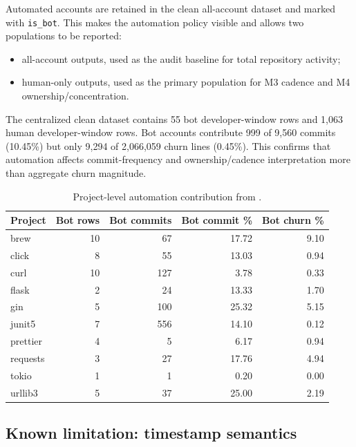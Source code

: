 Automated accounts are retained in the clean all-account dataset and marked with \texttt{is\_bot}. This makes the automation
policy visible and allows two populations to be reported:
\begin{itemize}[leftmargin=*]
  \item all-account outputs, used as the audit baseline for total repository activity;
  \item human-only outputs, used as the primary population for M3 cadence and M4 ownership/concentration.
\end{itemize}

The centralized clean dataset contains 55 bot developer-window rows and 1{,}063 human developer-window rows. Bot accounts contribute
999 of 9{,}560 commits (10.45\%) but only 9{,}294 of 2{,}066{,}059 churn lines (0.45\%). This confirms that automation affects
commit-frequency and ownership/cadence interpretation more than aggregate churn magnitude.

\begin{table}[H]
\centering
\scriptsize
\renewcommand{\arraystretch}{1.12}
\begin{tabular}{lrrrr}
\toprule
\textbf{Project} & \textbf{Bot rows} & \textbf{Bot commits} & \textbf{Bot commit \%} & \textbf{Bot churn \%} \\
\midrule
brew     & 10 & 67  & 17.72 & 9.10 \\
click    & 8  & 55  & 13.03 & 0.94 \\
curl     & 10 & 127 & 3.78  & 0.33 \\
flask    & 2  & 24  & 13.33 & 1.70 \\
gin      & 5  & 100 & 25.32 & 5.15 \\
junit5   & 7  & 556 & 14.10 & 0.12 \\
prettier & 4  & 5   & 6.17  & 0.94 \\
requests & 3  & 27  & 17.76 & 4.94 \\
tokio    & 1  & 1   & 0.20  & 0.00 \\
urllib3  & 5  & 37  & 25.00 & 2.19 \\
\bottomrule
\end{tabular}
\caption{Project-level automation contribution from \protect{}.}
\label{tab:bot_cleaning_summary}
\end{table}

\subsection{Known limitation: timestamp semantics}
\label{sec:phase1_author_date_lim}

